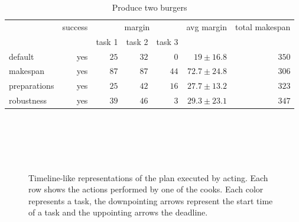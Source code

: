 \begin{table}
  \centering
  \begin{tabular}{lrrrrrr}
                & success & \multicolumn{3}{c}{margin}  & avg margin     & total makespan  \\
                &         &  task 1 & task 2  & task 3  &                &  \\ \hline
  default       & yes     & $25$    & $32$    &  $0$    & $19\pm16.8$           & $350$     \\
  makespan      & yes     & $87$    & $87$    &  $44$   & $72.7\pm24.8$         & $306$       \\
  preparations  & yes     & $25$    & $42$    &  $16$   & $27.7\pm13.2$         & $323$    \\
  robustness    & yes     & $39$    & $46$    &  $3$    & $29.3\pm23.1$         & $347$ \\
  \end{tabular}
  \caption{Produce two burgers}
  \label{tab:eval-acting}
\end{table}



\begin{figure}
  \centering
   \\\medskip
   \\\medskip
   \\\medskip
   \\\medskip
  \caption[Timeline-like representations of the acting evaluation]{Timeline-like representations of the plan executed by acting. Each row shows the actions performed by one of the cooks. Each color represents a task, the downpointing arrows represent the start time of a task and the uppointing arrows the deadline.}
  \label{fig:eval-acting}
\end{figure}
